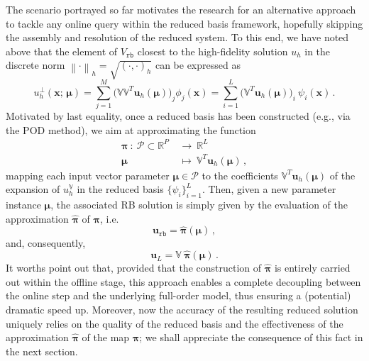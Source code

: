 \documentclass[12pt, a4paper, twoside, openright]{report}
\numberwithin{equation}{chapter}
\theoremstyle{theorem}
\theoremstyle{definition}
\theoremstyle{remark}
\theoremstyle{proposition}
\numberwithin{figure}{chapter}
\newcommand{\norm}[1]{\left\lVert#1\right\rVert}
\newcommand{\bg}[1]{\boldsymbol{#1}}
\begin{document}
		The scenario portrayed so far motivates the research for an alternative approach to tackle any online query within the reduced basis framework, hopefully skipping the assembly and resolution of the reduced system. To this end, we have noted above that the element of $V_{\texttt{rb}}$ closest to the high-fidelity solution $u_h$ in the discrete norm $\norm{\cdot}_h = \sqrt{(\cdot,\cdot)_h}$ can be expressed as
		\begin{equation}
			\label{eq:high-fidelity-projected}
			u^{\perp}_h(\bg{x}; \, \bg{\mu}) = \sum_{j = 1}^M \big( \mathbb{V} \mathbb{V}^T \mathbf{u}_h(\bg{\mu}) \big)_j \phi_j(\bg{x}) = \sum_{i = 1}^L \big( \mathbb{V}^T \mathbf{u}_h(\bg{\mu}) \big)_i ~ \psi_i(\bg{x}) \, .
		\end{equation} 
		Motivated by last equality, once a reduced basis has been constructed (e.g., via the POD method), we aim at approximating the function
		\begin{equation}
			\label{eq:map-to-approximate}
			\begin{aligned}
				\bg{\pi} ~ : ~ \mathcal{P} \subset \mathbb{R}^P ~ & \rightarrow ~ \mathbb{R}^L \\
				\bg{\mu} ~ & \mapsto ~ \mathbb{V}^T \mathbf{u}_h(\bg{\mu}) \, ,
			\end{aligned}
		\end{equation}
		mapping each input vector parameter $\bg{\mu} \in \mathcal{P}$ to the coefficients $\mathbb{V}^T \mathbf{u}_h(\bg{\mu})$ of the expansion of $u^{\mathbb{V}}_h$ in the reduced basis $\big\lbrace \psi_i \big\rbrace_{i = 1}^L$. Then, given a new parameter instance $\bg{\mu}$, the associated RB solution is simply given by the evaluation of the approximation $\hat{\bg{\pi}}$ of $\bg{\pi}$, i.e.
		\begin{equation}
			\mathbf{u}_{\texttt{rb}} = \hat{\bg{\pi}}(\bg{\mu}) \, ,
		\end{equation}
		and, consequently,
		\begin{equation}
			\mathbf{u}_L = \mathbb{V} ~ \hat{\bg{\pi}}(\bg{\mu}) \, .
		\end{equation}
		It worths point out that, provided that the construction of $\hat{\bg{\pi}}$ is entirely carried out within the offline stage, this approach enables a complete decoupling between the online step and the underlying full-order model, thus ensuring a (potential) dramatic speed up. Moreover, now the accuracy of the resulting reduced solution uniquely relies on the quality of the reduced basis and the effectiveness of the approximation $\hat{\bg{\pi}}$ of the map $\bg{\pi}$; we shall appreciate the consequence of this fact in the next section.
		
\end{document}
